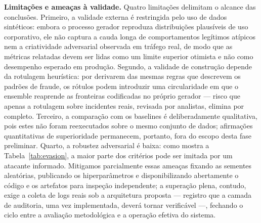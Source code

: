\documentclass[conference]{IEEEtran}
\begin{document}
\textbf{Limitações e ameaças à validade.} Quatro limitações delimitam o
alcance das conclusões. Primeiro, a validade externa é restringida pelo
uso de dados sintéticos: embora o processo gerador reproduza
distribuições plausíveis de uso corporativo, ele não captura a cauda
longa de comportamentos legítimos atípicos nem a criatividade
adversarial observada em tráfego real, de modo que as métricas relatadas
devem ser lidas como um limite superior otimista e não como desempenho
esperado em produção. Segundo, a validade de construção depende da
rotulagem heurística: por derivarem das mesmas regras que descrevem os
padrões de fraude, os rótulos podem introduzir uma circularidade em que
o ensemble reaprende as fronteiras codificadas no próprio gerador ---
risco que apenas a rotulagem sobre incidentes reais, revisada por
analistas, elimina por completo. Terceiro, a comparação com os baselines
é deliberadamente qualitativa, pois estes não foram reexecutados sobre o
mesmo conjunto de dados; afirmações quantitativas de superioridade
permanecem, portanto, fora do escopo desta fase preliminar. Quarto, a
robustez adversarial é baixa: como mostra a Tabela~\ref{tab:evasion}, a
maior parte dos critérios pode ser imitada por um atacante informado.
Mitigamos parcialmente essas ameaças fixando as sementes aleatórias,
publicando os hiperparâmetros e disponibilizando abertamente o código e
os artefatos para inspeção independente; a superação plena, contudo, exige a coleta de logs
reais sob a arquitetura proposta --- registro que a camada de auditoria,
uma vez implementada, deverá tornar verificável ---, fechando o ciclo
entre a avaliação metodológica e a operação efetiva do sistema.
\end{document}

